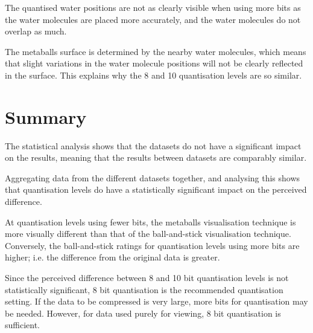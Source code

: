 The quantised water positions are not as clearly visible when using more bits
as the water molecules are placed more accurately, and the water molecules do
not overlap as much.

The metaballs surface is determined by the nearby water molecules, which means
that slight variations in the water molecule positions will not be clearly
reflected in the surface. This explains why the 8 and 10 quantisation levels
are so similar.



\section{Summary}
\label{sec:results_summary}

The statistical analysis shows that the datasets do not have a significant
impact on the results, meaning that the results between datasets are comparably
similar.

Aggregating data from the different datasets together, and analysing this shows
that quantisation levels do have a statistically significant impact on the
perceived difference.

At quantisation levels using fewer bits, the metaballs visualisation technique
is more visually different than that of the ball-and-stick visualisation
technique. Conversely, the ball-and-stick ratings for quantisation levels using
more bits are higher; i.e. the difference from the original data is greater.

Since the perceived difference between 8 and 10 bit quantisation levels is not
statistically significant, 8 bit quantisation is the recommended quantisation
setting. If the data to be compressed is very large, more bits for quantisation
may be needed. However, for data used purely for viewing, 8 bit quantisation is
sufficient.



